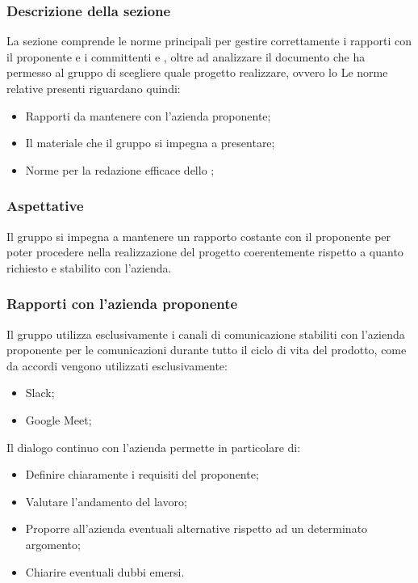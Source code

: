 \subsubsection{Descrizione della sezione} 
La sezione comprende le norme principali per gestire correttamente i rapporti con il proponente \Proponente e i committenti \VT e \CR, oltre ad analizzare il documento che ha permesso al gruppo di scegliere quale progetto realizzare, ovvero lo \SdF
Le norme relative presenti riguardano quindi:
\begin{itemize}
	\item Rapporti da mantenere con l'azienda proponente;
	\item Il materiale che il gruppo si impegna a presentare;
	\item Norme per la redazione efficace dello \SdF;
\end{itemize}

\subsubsection{Aspettative}
Il gruppo \Gruppo si impegna a mantenere un rapporto costante con il proponente \Proponente per poter procedere nella realizzazione del progetto coerentemente rispetto a quanto richiesto e stabilito con l'azienda. 

\subsubsection{Rapporti con l'azienda proponente \Proponente }\label{Rapporti RedBabel}
Il gruppo utilizza esclusivamente i canali di comunicazione stabiliti con l'azienda proponente per le comunicazioni durante tutto il ciclo di vita del prodotto, come da accordi vengono utilizzati esclusivamente:
\begin{itemize}
	\item Slack;
	\item Google Meet;
\end{itemize}
Il dialogo continuo con l'azienda permette in particolare di:
\begin{itemize}
	\item Definire chiaramente i requisiti del proponente;
	\item Valutare l'andamento del lavoro;
	\item Proporre all'azienda eventuali alternative rispetto ad un determinato argomento;
	\item Chiarire eventuali dubbi emersi.
\end{itemize}

